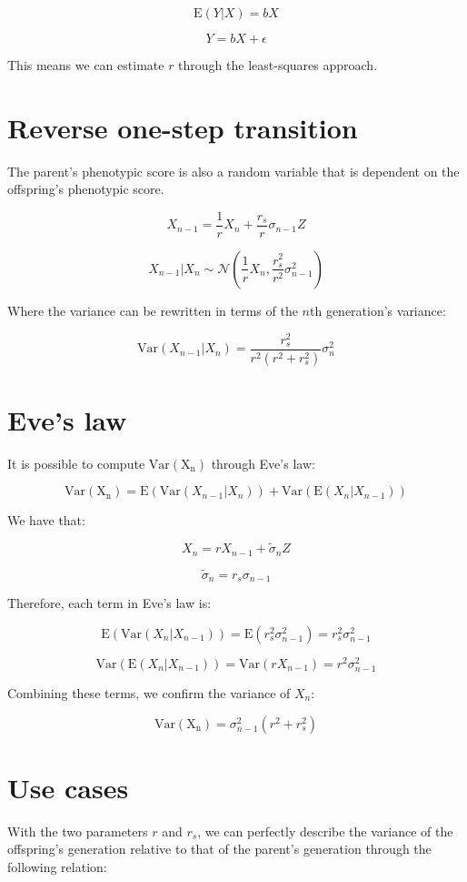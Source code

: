 \documentclass[a4paper,11pt]{article}
\begin{document}
$$\mathrm{E}(Y|X) = bX$$

$$Y = bX + \epsilon$$

This means we can estimate $r$ through the least-squares approach. 






\section{Reverse one-step transition}
The parent's phenotypic score is also a random variable that is dependent on the offspring's phenotypic score. 

$$X_{n-1} = \frac{1}{r}X_n + \frac{r_s}{r}\sigma_{n-1}Z$$


$$X_{n-1}|X_{n} \sim \mathcal{N}(\frac{1}{r}X_n, \frac{r_s^2}{r^2}\sigma_{n-1}^2)$$


Where the variance can be rewritten in terms of the $n$th generation's variance:

$$\mathrm{Var}(X_{n-1}|X_{n}) = \frac{r_s^2}{r^2(r^2+r_s^2)} \sigma_n^2$$

\section{Eve's law}
It is possible to compute $\mathrm{Var(X_n)}$ through Eve's law:

$$\mathrm{Var(X_n)} = \mathrm{E}(\mathrm{Var}(X_{n-1}|X_n)) + \mathrm{Var}(\mathrm{E}(X_n|X_{n-1}))$$

We have that:

$$X_n = rX_{n-1} + \tilde{\sigma}_n Z$$

$$\tilde{\sigma}_n = r_s \sigma_{n-1}$$

Therefore, each term in Eve's law is:

$$\mathrm{E}(\mathrm{Var}(X_{n}|X_{n-1})) = \mathrm{E}(r_s^2 \sigma_{n-1}^2) = r_s^2 \sigma_{n-1}^2$$

$$\mathrm{Var}(\mathrm{E}(X_n|X_{n-1})) = \mathrm{Var}(rX_{n-1}) = r^2\sigma_{n-1}^2$$

Combining these terms, we confirm the variance of $X_n$:

$$\mathrm{Var(X_n)} = \sigma_{n-1}^2(r^2 + r_s^2)$$









\section{Use cases}
With the two parameters $r$ and $r_s$, we can perfectly describe the variance of the offspring's generation relative to that of the parent's generation through the following relation:
\end{document}
